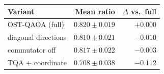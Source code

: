 \begin{tabular}{lrr}
\toprule
Variant & Mean ratio & $\Delta$ vs.\ full \\
\midrule
OST-QAOA (full) & $0.820\pm0.019$ & $+0.000$ \\
diagonal directions & $0.810\pm0.021$ & $-0.010$ \\
commutator off & $0.817\pm0.022$ & $-0.003$ \\
TQA + coordinate & $0.708\pm0.038$ & $-0.112$ \\
\bottomrule
\end{tabular}
